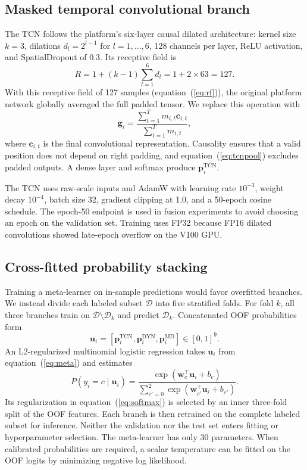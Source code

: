 \documentclass{iopjournal}
\begin{document}
\subsection{Masked temporal convolutional branch}\label{sec:tcn}

The TCN follows the platform's six-layer causal dilated architecture: kernel size $k=3$, dilations $d_l=2^{l-1}$ for $l=1,\ldots,6$, 128 channels per layer, ReLU activation, and SpatialDropout of 0.3. Its receptive field is
\begin{equation}
R=1+(k-1)\sum_{l=1}^{6}d_l=1+2\times63=127.
\label{eq:rf}
\end{equation}
With this receptive field of 127 samples (equation~(\ref{eq:rf})), the original platform network globally averaged the full padded tensor. We replace this operation with
\begin{equation}
\bm{g}_i=\frac{\sum_{t=1}^{T}m_{i,t}\bm{c}_{i,t}}{\sum_{t=1}^{T}m_{i,t}},
\label{eq:tcnpool}
\end{equation}
where $\bm{c}_{i,t}$ is the final convolutional representation. Causality ensures that a valid position does not depend on right padding, and equation~(\ref{eq:tcnpool}) excludes padded outputs. A dense layer and softmax produce $\bm{p}_i^{\mathrm{TCN}}$.

The TCN uses raw-scale inputs and AdamW with learning rate $10^{-3}$, weight decay $10^{-4}$, batch size 32, gradient clipping at 1.0, and a 50-epoch cosine schedule. The epoch-50 endpoint is used in fusion experiments to avoid choosing an epoch on the validation set. Training uses FP32 because FP16 dilated convolutions showed late-epoch overflow on the V100 GPU.

\subsection{Cross-fitted probability stacking}\label{sec:stack}

Training a meta-learner on in-sample predictions would favor overfitted branches. We instead divide each labeled subset $\mathcal{D}$ into five stratified folds. For fold $k$, all three branches train on $\mathcal{D}\setminus\mathcal{D}_k$ and predict $\mathcal{D}_k$. Concatenated OOF probabilities form
\begin{equation}
\bm{u}_i=\left[\bm{p}_i^{\mathrm{TCN}},\bm{p}_i^{\mathrm{DYN}},\bm{p}_i^{\mathrm{MD}}\right]\in[0,1]^9.
\label{eq:meta}
\end{equation}
An L2-regularized multinomial logistic regression takes $\bm{u}_i$ from equation~(\ref{eq:meta}) and estimates
\begin{equation}
P(y_i=c\mid\bm{u}_i)=\frac{\exp(\bm{w}_c^{\top}\bm{u}_i+b_c)}{\sum_{c'=0}^{2}\exp(\bm{w}_{c'}^{\top}\bm{u}_i+b_{c'})}.
\label{eq:softmax}
\end{equation}
Its regularization in equation~(\ref{eq:softmax}) is selected by an inner three-fold split of the OOF features. Each branch is then retrained on the complete labeled subset for inference. Neither the validation nor the test set enters fitting or hyperparameter selection. The meta-learner has only 30 parameters. When calibrated probabilities are required, a scalar temperature can be fitted on the OOF logits by minimizing negative log likelihood.
\end{document}
